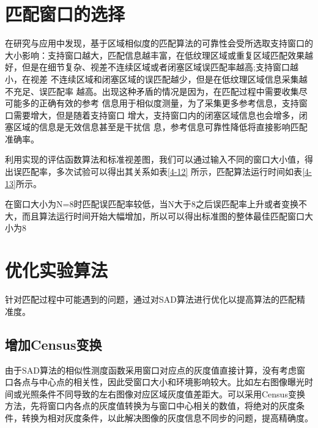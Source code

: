 
\section{匹配窗口的选择}

在研究与应用中发现，基于区域相似度的匹配算法的可靠性会受所选取支持窗口的大小影响：支持窗口越大，匹配信息越丰富，在低纹理区域或重复区域匹配效果越好，但是在细节复杂、视差不连续区域或者闭塞区域误匹配率越高;支持窗口越小，在视差
不连续区域和闭塞区域的误匹配越少，但是在低纹理区域信息采集越不充足、误匹配率
越高。出现这种矛盾的情况是因为，在匹配过程中需要收集尽可能多的正确有效的参考
信息用于相似度测量，为了采集更多参考信息，支持窗口需要增大，但是随着支持窗口
增大，支持窗口内的闭塞区域信息也会增多，闭塞区域的信息是无效信息甚至是干扰信
息，参考信息可靠性降低将直接影响匹配准确率。

利用实现的评估函数算法和标准视差图，我们可以通过输入不同的窗口大小值，得出误匹配率，多次试验可以得出其关系如表\ref{4-12}
所示，匹配算法运行时间如表\ref{4-13}所示。


在窗口大小为N=8时匹配误匹配率较低，当N大于8之后误匹配率上升或者变换不大，而且算法运行时间开始大幅增加，所以可以得出标准图的整体最佳匹配窗口大小为8

\section{优化实验算法}

针对匹配过程中可能遇到的问题，通过对SAD算法进行优化以提高算法的匹配精准度。

\subsection{增加Census变换}


由于SAD算法的相似性测度函数采用窗口对应点的灰度值直接计算，没有考虑窗口各点与中心点的相关性，因此受窗口大小和环境影响较大。比如左右图像曝光时间或光照条件不同导致的左右图像对应区域灰度值差距大。可以采用Census变换方法，先将窗口内各点的灰度值转换为与窗口中心相关的数值，将绝对的灰度条件，转换为相对灰度条件，以此解决图像的灰度信息不同步的问题，提高精确度。

